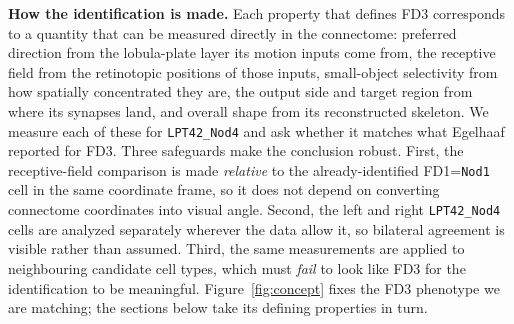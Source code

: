 \documentclass[11pt]{article}
\newcommand{\ttt}[1]{\texttt{#1}}
\begin{document}
\textbf{How the identification is made.}\quad
Each property that defines FD3 corresponds to a quantity that can be measured directly in the
connectome: preferred direction from the lobula-plate layer its motion inputs come from, the
receptive field from the retinotopic positions of those inputs, small-object selectivity from how
spatially concentrated they are, the output side and target region from where its synapses land,
and overall shape from its reconstructed skeleton. We measure each of these for \ttt{LPT42\_Nod4}
and ask whether it matches what Egelhaaf reported for FD3. Three safeguards make the conclusion
robust. First, the receptive-field comparison is made \emph{relative} to the already-identified
FD1=\ttt{Nod1} cell in the same coordinate frame, so it does not depend on converting connectome
coordinates into visual angle. Second, the left and right \ttt{LPT42\_Nod4} cells are analyzed
separately wherever the data allow it, so bilateral agreement is visible rather than assumed.
Third, the same measurements are applied to neighbouring candidate cell types, which must
\emph{fail} to look like FD3 for the identification to be meaningful. Figure~\ref{fig:concept}
fixes the FD3 phenotype we are matching; the sections below take its defining properties in turn.
\end{document}

